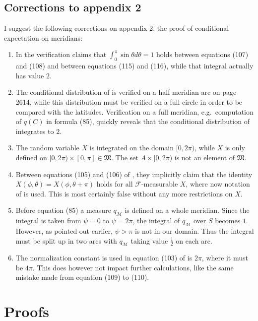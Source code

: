\documentclass[a4paper]{report}
\theoremstyle{plain}
\theoremstyle{definition}
\theoremstyle{remark}
\numberwithin{equation}{chapter}
\DeclareMathOperator{\1}{\mathbbm{1}}
\newcommand{\F}{\mathcal{F}}
\begin{document}
\section{Corrections to appendix 2}\label{app:CorMer}
I suggest the following corrections on appendix 2, the proof of conditional expectation on meridians:
\begin{enumerate}
\item In the verification \cite{Gyenis17} claims that $\int_0^\pi\sin\theta d\theta=1$ holds between equations (107) and (108) and between equations (115) and (116), while that integral actually has value $2$.
\item The conditional distribution of \cite{Gyenis17} is verified on a half meridian arc on page 2614, while this distribution must be verified on a full circle in order to be compared with the latitudes. Verification on a full meridian, e.g.~computation of $q(C)$ in formula (85), quickly reveals that the conditional distribution of \cite{Gyenis17} integrates to $2$.
\item The random variable $X$ is integrated on the domain $[0,2\pi)$, while $X$ is only defined on $[0,2\pi)\times[0,\pi]\in\mathfrak{M}$. The set $A\times[0,2\pi)$ is not an element of $\mathfrak{M}$.
\item Between equations (105) and (106) of \cite{Gyenis17}, they implicitly claim that the identity $X(\phi,\theta)=X(\phi,\theta+\pi)$ holds for all $\F$-measurable $X$, where now notation of \cite{Gyenis17} is used. This is most certainly false without any more restrictions on $X$.
\item Before equation (85) a measure $q_\mathcal{M}$ is defined on a whole meridian. Since the integral is taken from $\psi=0$ to $\psi=2\pi$, the integral of $q_\mathcal{M}$ over $S$ becomes $1$. However, as pointed out earlier, $\psi>\pi$ is not in our domain. Thus the integral must be split up in two arcs with $q_{\mathcal{M}}$ taking value $\frac{1}{2}$ on each arc.
\item The normalization constant is used in equation (103) of \cite{Gyenis17} is $2\pi$, where it must be $4\pi$. This does however not impact further calculations, like the same mistake made from equation (109) to (110).
\end{enumerate}

\chapter{Proofs}
\end{document}
